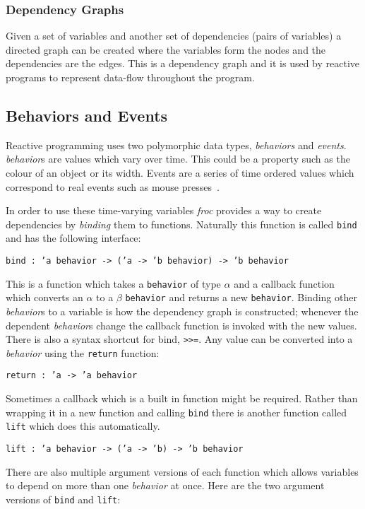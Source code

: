 \subsubsection{Dependency Graphs}
Given a set of variables and another set of dependencies (pairs of variables) a directed graph can be created where the variables form the nodes and the dependencies are the edges. This is a dependency graph and it is used by reactive programs to represent data-flow throughout the program.

\subsection{Behaviors and Events}
\label{lab:behavior}
Reactive programming uses two polymorphic data types, \emph{behaviors} and \emph{events}. \emph{behavior}s are values which vary over time. This could be a property such as the colour of an object or its width. Events are a series of time ordered values which correspond to real events such as mouse presses~\cite{bib:lambda}.

In order to use these time-varying variables \emph{froc} provides a way to create dependencies by \emph{binding} them to functions. Naturally this function is called \texttt{bind} and has the following interface:

\texttt{bind : 'a behavior -> ('a -> 'b behavior) -> 'b behavior}

This is a function which takes a \texttt{behavior} of type $\alpha$ and a callback function which converts an $\alpha$ to a $\beta$ \texttt{behavior} and returns a new \texttt{behavior}. Binding other \emph{behavior}s to a variable is how the dependency graph is constructed; whenever the dependent \emph{behavior}s change the callback function is invoked with the new values. There is also a syntax shortcut for bind, \texttt{\textgreater\textgreater=}.
\pagebreak
Any value can be converted into a \emph{behavior} using the \texttt{return} function:

\texttt{return : 'a -> 'a behavior}

Sometimes a callback which is a built in function might be required. Rather than wrapping it in a new function and calling \texttt{bind} there is another function called \texttt{lift} which does this automatically.

\texttt{lift : 'a behavior -> ('a -> 'b) -> 'b behavior}

There are also multiple argument versions of each function which allows variables to depend on more than one \emph{behavior} at once. Here are the two argument versions of \texttt{bind} and \texttt{lift}:


